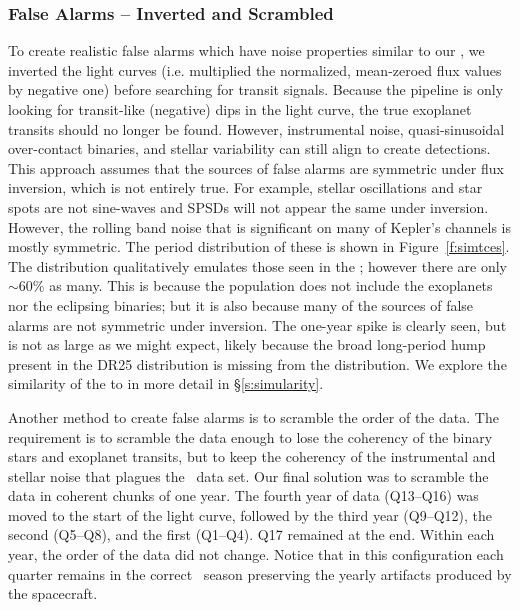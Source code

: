 \subsubsection{False Alarms -- Inverted and Scrambled} 

To create realistic false alarms which have noise properties similar to our , we inverted the light curves (i.e. multiplied the normalized, mean-zeroed flux values by negative one) before searching for transit signals. Because the pipeline is only looking for transit-like (negative) dips in the light curve, the true exoplanet transits should no longer be found. However, instrumental noise, quasi-sinusoidal over-contact binaries, and stellar variability can still align to create detections. This approach assumes that the sources of false alarms are symmetric under flux inversion, which is not entirely true. For example, stellar oscillations and star spots are not sine-waves and SPSDs will not appear the same under inversion. However, the rolling band noise that is significant on many of Kepler's channels is mostly symmetric.  The period distribution of these  is shown in Figure~\ref{f:simtces}. The distribution qualitatively emulates those seen in the ; however there are only $\sim$60\% as many.  This is because the population does not include the exoplanets nor the eclipsing binaries; but it is also because many of the sources of false alarms are not symmetric under inversion.  The one-year spike is clearly seen, but is not as large as we might expect, likely because the broad long-period hump present in the DR25 \opstce{} distribution is missing from the \invtce{} distribution. We explore the similarity of the  to  in more detail in \S\ref{s:simularity}.

Another method to create false alarms is to scramble the order of the data. The requirement is to scramble the data enough to lose the coherency of the binary stars and exoplanet transits, but to keep the coherency of the instrumental and stellar noise that plagues the \Kepler\ data set. Our final solution was to scramble the data in coherent chunks of one year. The fourth year of data (Q13--Q16) was moved to the start of the light curve, followed by the third year (Q9--Q12), the second (Q5--Q8), and the first (Q1--Q4). Q17 remained at the end. Within each year, the order of the data did not change. Notice that in this configuration each quarter remains in the correct \Kepler\ season preserving the yearly artifacts produced by the spacecraft.


